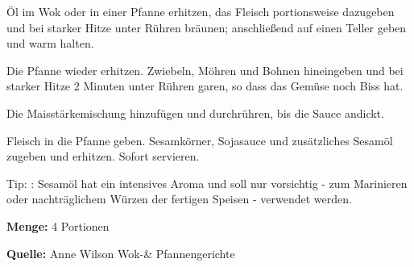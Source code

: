 { Öl im Wok oder in einer Pfanne erhitzen, das Fleisch portionsweise dazugeben und bei starker Hitze unter Rühren bräunen; anschließend auf einen Teller geben und warm halten.

 Die Pfanne wieder erhitzen. Zwiebeln, Möhren und Bohnen hineingeben und bei starker Hitze 2 Minuten unter Rühren garen, so dass das Gemüse noch Biss hat.

Die Maisstärkemischung hinzufügen und durchrühren, bis die Sauce andickt.

Fleisch in die Pfanne geben. Sesamkörner, Sojasauce und zusätzliches Sesamöl zugeben und erhitzen. Sofort servieren.

 Tip: : Sesamöl hat ein intensives Aroma und soll nur vorsichtig -
zum Marinieren oder nachträglichem Würzen der fertigen Speisen - verwendet werden.


{\bfseries Menge:} 4 Portionen

{\bfseries Quelle:} Anne Wilson  Wok-\& Pfannengerichte 

} 

